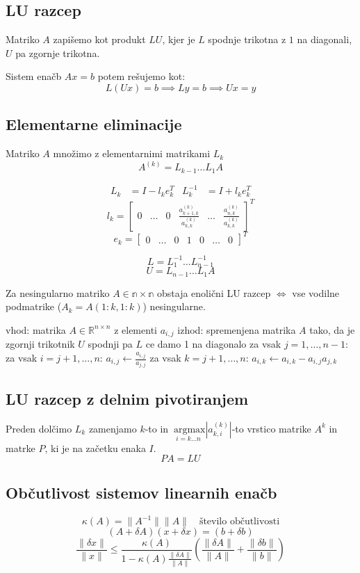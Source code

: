 \begin{multicols}{5}
\section{LU razcep}
Matriko $A$ zapišemo kot produkt $LU$, kjer je $L$ spodnje trikotna z $1$ na diagonali, $U$ pa zgornje trikotna.

Sistem enačb $Ax = b$ potem rešujemo kot:
\[L(Ux) = b \implies Ly = b \implies Ux = y\]

\subsection{Elementarne eliminacije}
Matriko $A$ množimo z elementarnimi matrikami $L_k$
\[ A^{(k)} = L_{k-1} \dots L_1 A\]

\begin{align*}
	L_k &= I - l_k e_k^T & L_k^{-1} &= I + l_k e_k^T
\end{align*}
\[ l_k = \begin{bmatrix}
	0 &
	\dots &
	0 &
	\frac{a^{(k)}_{k+1, k}}{a^{(k)}_{k, k}} &
	\dots &
	\frac{a^{(k)}_{n, k}}{a^{(k)}_{k, k}}
\end{bmatrix}^T \]
\[ e_k = \begin{bmatrix}
	0 &
	\dots &
	0 &
	1 &
	0 &
	\dots &
	0
\end{bmatrix}^T \]

\[L = L_1^{-1} \dots L_{n-1}^{-1}\]
\[U = L_{n-1} \dots L_1 A\]

Za nesingularno matriko $A \in \mathbb{n\times n}$ obstaja enolični LU razcep $\iff$ vse vodilne podmatrike ($A_k = A(1:k, 1:k)$) nesingularne.
\begin{koda}
vhod: matrika $A \in \mathbb{R}^{n\times n}$ z elementi $a_{i,j}$
izhod: spremenjena matrika $A$ tako, da je zgornji
trikotnik $U$ spodnji pa $L$ ce damo 1 na diagonalo
za vsak $j = 1,\dots, n-1$:
	za vsak $i = j+1,\dots,n$:
		$a_{i,j} \leftarrow \frac{a_{i,j}}{a_{j,j}}$
		za vsak $k = j+1, \dots, n$:
			$a_{i,k} \leftarrow a_{i,k}-a_{i,j}a_{j,k}$  
\end{koda}

\subsection{LU razcep z delnim pivotiranjem}
Preden dolčimo $L_k$ zamenjamo $k$-to in $\underset{i=k \dots n}{\ \mathrm{argmax}} |a^{(k)}_{k,i}|$-to vrstico matrike $A^{k}$ in matrke $P$, ki je na začetku enaka $I$.
\[PA = LU\]

\subsection{Občutlivost sistemov linearnih enačb}
\[ \kappa(A) = \| A^{-1} \| \| A \| \quad \text{število občutlivosti}\]
\[ (A + \delta A)(x + \delta x) = (b + \delta b)\]
\[ \frac{\| \delta x \| }{\| x \|} \leq \frac{\kappa(A)}{1-\kappa(A) \frac{\| \delta A \|}{\| A \|}} \left( \frac{\| \delta A \|}{\| A \|} + \frac{\| \delta b \|}{\| b \|} \right)\]


\end{multicols}
